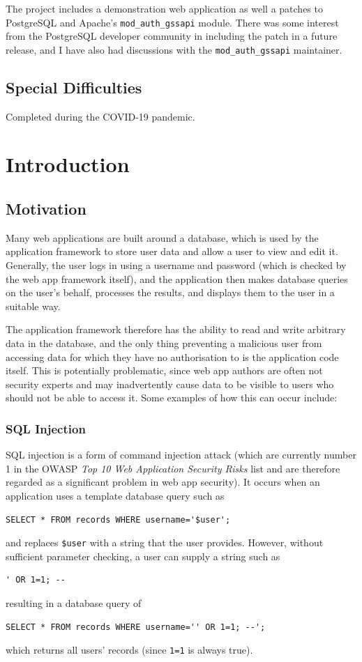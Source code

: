 \documentclass[12pt]{report}
\begin{document}
The project includes a demonstration web application as well a patches to PostgreSQL and Apache's \verb+mod_auth_gssapi+ module. There was some interest from the PostgreSQL developer community in including the patch in a future release, and I have also had discussions with the \verb+mod_auth_gssapi+ maintainer.

\section*{Special Difficulties}
Completed during the COVID-19 pandemic.

\tableofcontents

\chapter{Introduction}

\section{Motivation}
\label{sec:motivation}
Many web applications are built around a database, which is used by the application framework to store user data and allow a user to view and edit it. Generally, the user logs in using a username and password (which is checked by the web app framework itself), and the application then makes database queries on the user's behalf, processes the results, and displays them to the user in a suitable way.

The application framework therefore has the ability to read and write arbitrary data in the database, and the only thing preventing a malicious user from accessing data for which they have no authorisation to is the application code itself. This is potentially problematic, since web app authors are often not security experts and may inadvertently cause data to be visible to users who should not be able to access it. Some examples of how this can occur include:

\subsection{SQL Injection}
\label{sec:sql_injection}
SQL injection is a form of command injection attack (which are currently number 1 in the OWASP \textit{Top 10 Web Application Security Risks} list\cite{OWASP10} and are therefore regarded as a significant problem in web app security). It occurs when an application uses a template database query such as
\begin{verbatim}
SELECT * FROM records WHERE username='$user';
\end{verbatim}
and replaces \verb+$user+ with a string that the user provides. However, without sufficient parameter checking, a user can supply a string such as
\begin{verbatim}
' OR 1=1; --
\end{verbatim}
resulting in a database query of
\begin{verbatim}
SELECT * FROM records WHERE username='' OR 1=1; --';
\end{verbatim}
which returns all users' records (since \verb+1=1+ is always true).
\end{document}

